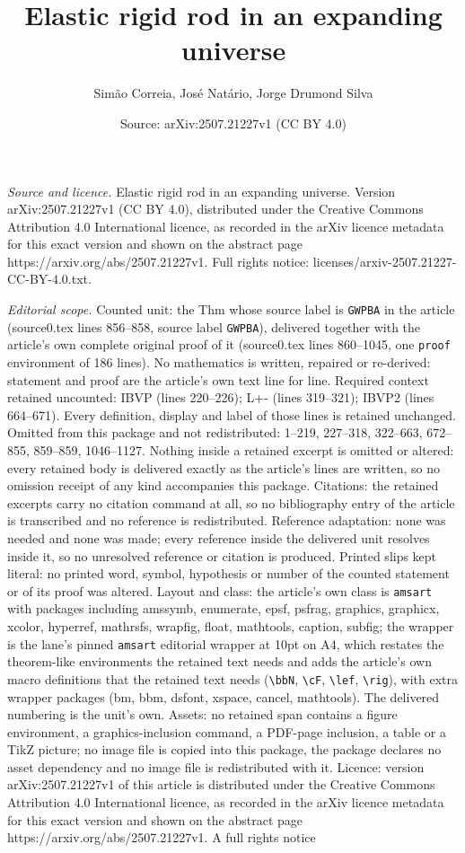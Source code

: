 \documentclass[10pt,a4paper]{amsart}
\title[Elastic rigid rod in an expanding universe]{Elastic rigid rod in an expanding universe}
\author{Sim\~ao Correia, Jos\'e Nat\'ario, Jorge Drumond Silva}
\date{Source: arXiv:2507.21227v1 (CC BY 4.0)}
\begin{document}
\maketitle

\noindent\emph{Source and licence.} Elastic rigid rod in an expanding universe. Version arXiv:2507.21227v1 (CC BY 4.0), distributed under the Creative Commons Attribution 4.0 International licence, as recorded in the arXiv licence metadata for this exact version and shown on the abstract page https://arxiv.org/abs/2507.21227v1. Full rights notice: licenses/arxiv-2507.21227-CC-BY-4.0.txt.\par\smallskip

\noindent\textit{Editorial scope.} Counted unit: the Thm whose source label is \texttt{GWPBA} in the article (source0.tex lines 856--858, source label \texttt{GWPBA}), delivered together with the article's own complete original proof of it (source0.tex lines 860--1045, one \texttt{proof} environment of 186 lines). No mathematics is written, repaired or re-derived: statement and proof are the article's own text line for line. Required context retained uncounted: IBVP (lines 220--226); L+- (lines 319--321); IBVP2 (lines 664--671). Every definition, display and label of those lines is retained unchanged. Omitted from this package and not redistributed: 1--219, 227--318, 322--663, 672--855, 859--859, 1046--1127. Nothing inside a retained excerpt is omitted or altered: every retained body is delivered exactly as the article's lines are written, so no omission receipt of any kind accompanies this package. Citations: the retained excerpts carry no citation command at all, so no bibliography entry of the article is transcribed and no reference is redistributed. Reference adaptation: none was needed and none was made; every reference inside the delivered unit resolves inside it, so no unresolved reference or citation is produced. Printed slips kept literal: no printed word, symbol, hypothesis or number of the counted statement or of its proof was altered. Layout and class: the article's own class is \texttt{amsart} with packages including amssymb, enumerate, epsf, psfrag, graphics, graphicx, xcolor, hyperref, mathrsfs, wrapfig, float, mathtools, caption, subfig; the wrapper is the lane's pinned \texttt{amsart} editorial wrapper at 10pt on A4, which restates the theorem-like environments the retained text needs and adds the article's own macro definitions that the retained text needs (\texttt{\textbackslash bbN}, \texttt{\textbackslash cF}, \texttt{\textbackslash lef}, \texttt{\textbackslash rig}), with extra wrapper packages (bm, bbm, dsfont, xspace, cancel, mathtools). The delivered numbering is the unit's own. Assets: no retained span contains a figure environment, a graphics-inclusion command, a PDF-page inclusion, a table or a TikZ picture; no image file is copied into this package, the package declares no asset dependency and no image file is redistributed with it. Licence: version arXiv:2507.21227v1 of this article is distributed under the Creative Commons Attribution 4.0 International licence, as recorded in the arXiv licence metadata for this exact version and shown on the abstract page https://arxiv.org/abs/2507.21227v1. A full rights notice 
\end{document}
